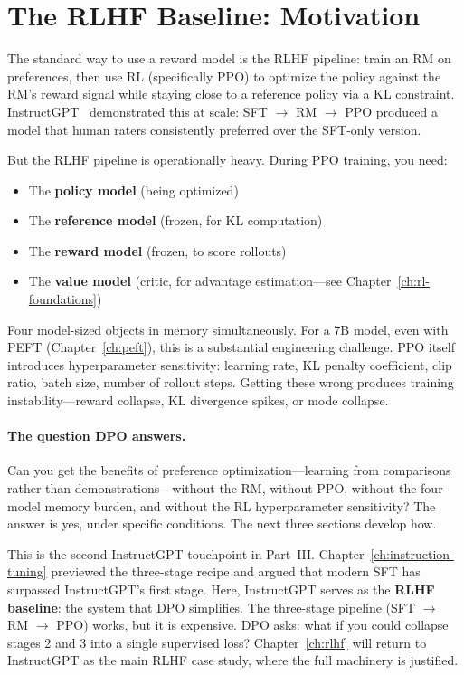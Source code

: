 \section{The RLHF Baseline: Motivation}
\label{sec:rlhf-motivation}

The standard way to use a reward model is the RLHF pipeline: train an RM on preferences, then use RL (specifically PPO) to optimize the policy against the RM's reward signal while staying close to a reference policy via a KL constraint. InstructGPT~\cite{ouyang2022instructgpt} demonstrated this at scale: SFT $\to$ RM $\to$ PPO produced a model that human raters consistently preferred over the SFT-only version.

But the RLHF pipeline is operationally heavy. During PPO training, you need:

\begin{itemize}[nosep]
  \item The \textbf{policy model} (being optimized)
  \item The \textbf{reference model} (frozen, for KL computation)
  \item The \textbf{reward model} (frozen, to score rollouts)
  \item The \textbf{value model} (critic, for advantage estimation---see Chapter~\ref{ch:rl-foundations})
\end{itemize}

Four model-sized objects in memory simultaneously. For a 7B model, even with PEFT (Chapter~\ref{ch:peft}), this is a substantial engineering challenge. PPO itself introduces hyperparameter sensitivity: learning rate, KL penalty coefficient, clip ratio, batch size, number of rollout steps. Getting these wrong produces training instability---reward collapse, KL divergence spikes, or mode collapse.

\paragraph{The question DPO answers.} Can you get the benefits of preference optimization---learning from comparisons rather than demonstrations---without the RM, without PPO, without the four-model memory burden, and without the RL hyperparameter sensitivity? The answer is yes, under specific conditions. The next three sections develop how.

\begin{tcolorbox}[colback=orange!5, colframe=orange!60, title=\textbf{The InstructGPT Thread --- Baseline}]
This is the second InstructGPT touchpoint in Part~III. Chapter~\ref{ch:instruction-tuning} previewed the three-stage recipe and argued that modern SFT has surpassed InstructGPT's first stage. Here, InstructGPT serves as the \textbf{RLHF baseline}: the system that DPO simplifies. The three-stage pipeline (SFT $\to$ RM $\to$ PPO) works, but it is expensive. DPO asks: what if you could collapse stages 2 and 3 into a single supervised loss? Chapter~\ref{ch:rlhf} will return to InstructGPT as the main RLHF case study, where the full machinery is justified.
\end{tcolorbox}

